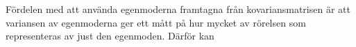 Fördelen med att använda egenmoderna framtagna från kovariansmatrisen är att variansen av egenmoderna ger ett mått på hur mycket av rörelsen som representeras av just den egenmoden. Därför kan 




